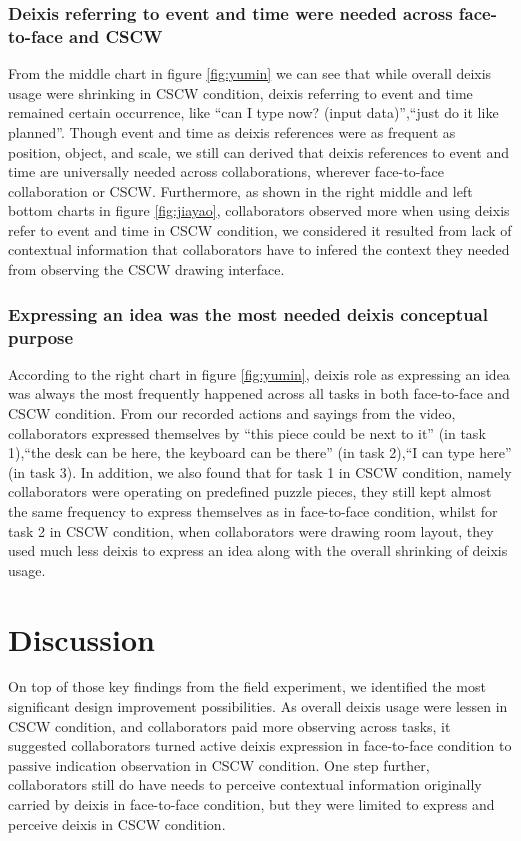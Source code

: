 \documentclass[12pt,twoside]{article}
\begin{document}
\subsubsection{Deixis referring to event and time were needed across face-to-face and CSCW}

From the middle chart in figure \ref{fig:yumin} we can see that while overall deixis usage were shrinking in CSCW condition, deixis referring to event and time remained certain occurrence, like ``can I type now? (input data)'',``just do it like planned''. Though event and time as deixis references were as frequent as position, object, and scale, we still can derived that deixis references to event and time are universally needed across collaborations, wherever face-to-face collaboration or CSCW. Furthermore, as shown in the right middle and left bottom charts in figure \ref{fig:jiayao}, collaborators observed more when using deixis refer to event and time in CSCW condition, we considered it resulted from lack of contextual information that collaborators have to infered the context they needed from observing the CSCW drawing interface.

\subsubsection{Expressing an idea was the most needed deixis conceptual purpose}

According to the right chart in figure \ref{fig:yumin}, deixis role as expressing an idea was always the most frequently happened across all tasks in both face-to-face and CSCW condition. From our recorded actions and sayings from the video, collaborators expressed themselves by ``this piece could be next to it'' (in task 1),``the desk can be here, the keyboard can be there'' (in task 2),``I can type here'' (in task 3). In addition, we also found that for task 1 in CSCW condition, namely collaborators were operating on predefined puzzle pieces, they still kept almost the same frequency to express themselves as in face-to-face condition, whilst for task 2 in CSCW condition, when collaborators were drawing room layout, they used much less deixis to express an idea along with the overall shrinking of deixis usage.

\section{Discussion}
\label{sec:discussion}
On top of those key findings from the field experiment, we identified the most significant design improvement possibilities. As overall deixis usage were lessen in CSCW condition, and collaborators paid more observing across tasks, it suggested collaborators turned active deixis expression in face-to-face condition to passive indication observation in CSCW condition. One step further, collaborators still do have needs to perceive contextual information originally carried by deixis in face-to-face condition, but they were limited to express and perceive deixis in CSCW condition.
\end{document}
